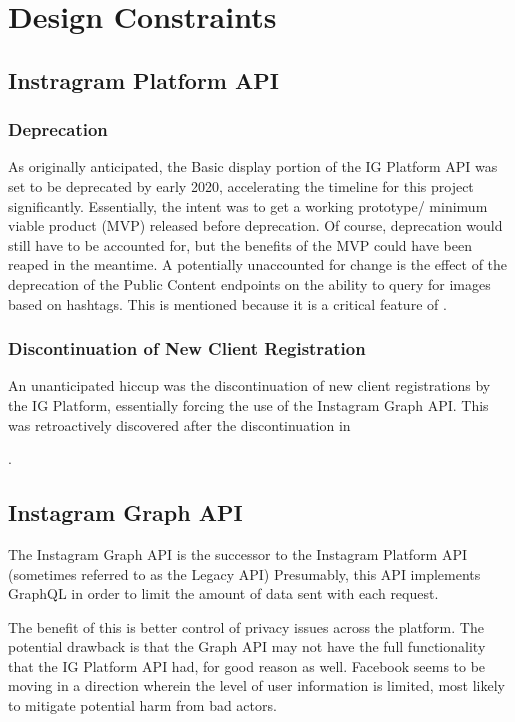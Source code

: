 \section{Design Constraints}

\subsection{Instragram Platform API}
\subsubsection{Deprecation}
As originally anticipated, the Basic display portion of the IG Platform API was set to be deprecated by early 2020,
accelerating the timeline for this project significantly. Essentially, the intent was to get a working prototype/
minimum viable product (MVP) released before deprecation. Of course, deprecation would still have to be accounted for,
but the benefits of the MVP could have been reaped in the meantime. A potentially unaccounted for change is the effect 
of the deprecation of the Public Content endpoints on the ability to query for images based on hashtags.
This is mentioned because it is a critical feature of \serviceName.

\subsubsection{Discontinuation of New Client Registration}
An unanticipated hiccup was the discontinuation of new client registrations by the IG Platform,
essentially forcing the use of the Instagram Graph API. This was retroactively discovered after the discontinuation
in \date{October 15, 2019}.

\subsection{Instagram Graph API}
The Instagram Graph API is the successor to the Instagram Platform API (sometimes referred to as the Legacy API)
Presumably, this API implements GraphQL in order to limit the amount of data sent with each request.

The benefit of this is better control of privacy issues across the platform. The potential drawback is that
the Graph API may not have the full functionality that the IG Platform API had, for good reason as well.
Facebook seems to be moving in a direction wherein the level of user information is limited, most likely to mitigate potential harm from bad actors.



